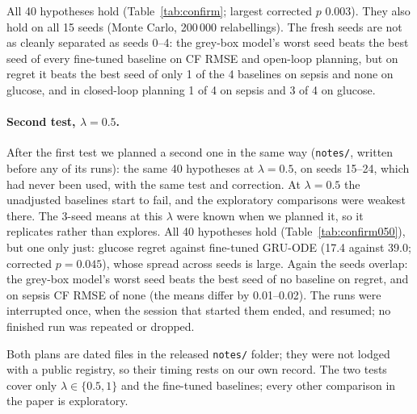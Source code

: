 \documentclass[letterpaper]{article}
\begin{document}
All 40 hypotheses hold (Table~\ref{tab:confirm}; largest corrected $p$ 0.003). They also hold on all 15 seeds (Monte Carlo, 200\,000 relabellings). The fresh seeds are not as cleanly separated as seeds 0--4: the grey-box model's worst seed beats the best seed of every fine-tuned baseline on CF RMSE and open-loop planning, but on regret it beats the best seed of only 1 of the 4 baselines on sepsis and none on glucose, and in closed-loop planning 1 of 4 on sepsis and 3 of 4 on glucose. \paragraph{Second test, $\lambda=0.5$.} After the first test we planned a second one in the same way (\texttt{notes/}, written before any of its runs): the same 40 hypotheses at $\lambda=0.5$, on seeds 15--24, which had never been used, with the same test and correction. At $\lambda=0.5$ the unadjusted baselines start to fail, and the exploratory comparisons were weakest there. The 3-seed means at this $\lambda$ were known when we planned it, so it replicates rather than explores. All 40 hypotheses hold (Table~\ref{tab:confirm050}), but one only just: glucose regret against fine-tuned GRU-ODE (17.4 against 39.0; corrected $p=0.045$), whose spread across seeds is large. Again the seeds overlap: the grey-box model's worst seed beats the best seed of no baseline on regret, and on sepsis CF RMSE of none (the means differ by 0.01--0.02). The runs were interrupted once, when the session that started them ended, and resumed; no finished run was repeated or dropped.

Both plans are dated files in the released \texttt{notes/} folder; they were not lodged with a public registry, so their timing rests on our own record. The two tests cover only $\lambda\in\{0.5,1\}$ and the fine-tuned baselines; every other comparison in the paper is exploratory.

\begin{table}[t]
\centering
\small

\caption{Confirmatory test on 10 fresh seeds at $\lambda=1$: mean of the grey-box model / mean of the fine-tuned baseline. Plan: planning regret, open loop; CL: closed loop. $^{*}$: Holm-corrected $p<0.05$ on the fresh seeds; $^{\dagger}$: also on all 15 seeds. Code: \texttt{scripts/confirmatory\_test.py}.}
\label{tab:confirm}
\end{table}

\begin{table}[t]
\centering
\small

\caption{Second confirmatory test, on 10 fresh seeds (15--24) at $\lambda=0.5$: mean of the grey-box model / mean of the fine-tuned baseline. $^{*}$: Holm-corrected $p<0.05$. Columns as in Table~\ref{tab:confirm}.}
\label{tab:confirm050}
\end{table}
\end{document}
